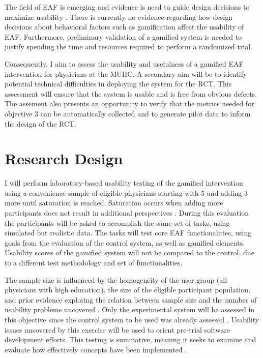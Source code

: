 %
%
The field of \gls{EAF} is emerging and evidence is need to guide design decisions to maximize usability \cite{brown2016interface}. There is currently no evidence regarding how design decisions about behavioral factors such as gamification affect the usability of \gls{EAF}. Furthermore, preliminary validation of a gamified system is needed to justify spending the time and resources required to perform a randomized trial.

Consequently, I aim to assess the usability and usefulness of a gamified \gls{EAF} intervention for physicians at the \gls{MUHC}. A secondary aim will be to identify potential technical difficulties in deploying the system for the \gls{RCT}. This assessment will ensure that the system is usable and is free from obvious defects. The assement  also presents an opportunity to verify that the metrics needed for objective 3 can be automatically collected and to generate pilot data to inform the design of the RCT.

\section{Research Design}
I will perform laboratory-based usability testing of the gamified intervention using a convenience sample of eligible physicians starting with 5 and adding 3 more until saturation is reached. Saturation occurs when adding more participants does not result in additional perspectives \cite{green2018qualitative}. During this evaluation the participants will be asked to accomplish the same set of tasks, using simulated but realistic data. The tasks will test core \gls{EAF} functionalities, using goals from the evaluation of the control system, as well as gamified elements. Usability scores of the gamified system will not be compared to the control, due to a different test methodology and set of functionalities.

The sample size is influenced by the homogeneity of the user group (all physicians with high education), the size of the eligible participant population, and prior evidence exploring the relation between sample size and the number of usability problems uncovered \cite{nielsen1993mathematical}. Only the experimental system will be assessed in this objective since the control system to be used was already assessed \cite{brown2016interface}. Usability issues uncovered by this exercise will be used to orient pre-trial software development efforts. This testing is  summative, meaning it seeks to examine and evaluate how effectively concepts have been implemented \cite{rubin2008handbook}.

